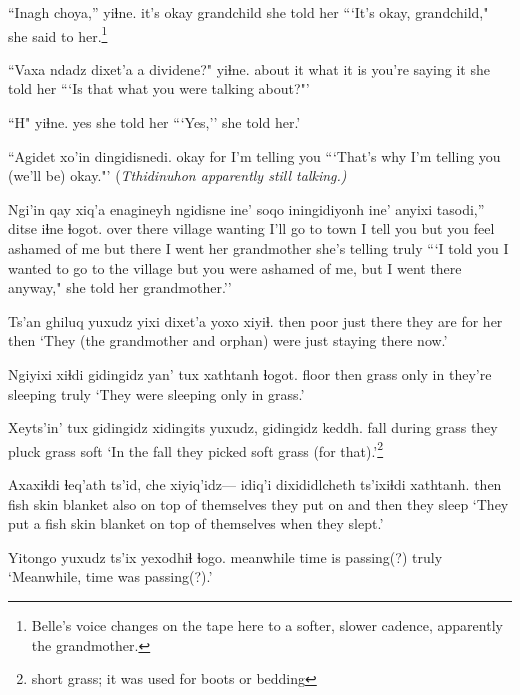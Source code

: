 \documentclass[12pt]{article}
\begin{document}
\gll ``Inagh     choya,''      yiɬne.
{it's okay}  grandchild {she told her}
\glt ```It's okay, grandchild," she said to her.\footnote{Belle's voice changes on the tape here to a softer, slower cadence, apparently the grandmother.}
\glend

\gll ``Vaxa ndadz dixet'a a dividene?"       yiɬne.
{about it} what  {it is} {}  {you're saying it} {she told her}
\glt ```Is that what you were talking about?"'
\glend

\gll ``H" yiɬne.
yes   {she told her}
\glt ```Yes,'' she told her.'
\glend

\gll ``Agidet xo'in dingidisnedi.
{okay}  for   {I'm telling you}
\glt ```That's why I'm telling you (we'll be) okay."' (\em Tthidinuhon \em apparently still talking.)
\glend

\gll Ngi'in     qay     xiq'a enagineyh ngidisne   ine' {soqo iningidiyonh} ine' anyixi     tasodi,'' ditse           iɬne          ɬogot.
{over there} village wanting {I'll go to town}  {I tell you} but  {you feel ashamed of me} but {there} {I went}  {her grandmother} {she's telling } truly
\glt ```I told you I wanted to go to the village but you were ashamed of me, but I went there anyway," she told her grandmother.''
\glend

\gll Ts'an ghiluq yuxudz yixi       dixet'a  yoxo    xiyiɬ.
then poor just there {they are}  {for her} then
\glt `They (the grandmother and orphan) were just staying there now.'
\glend

\gll Ngiyixi xiɬdi gidingidz yan' tux xathtanh       ɬogot.
floor    then  grass     only in {they're sleeping} truly
\glt `They were sleeping only in grass.'
\glend

\gll Xeyts'in' tux    gidingidz xidingits  yuxudz, gidingidz keddh.
fall      during grass     {they pluck} {}    grass     soft 
\glt `In the fall they picked soft grass (for that).'\footnote{short grass; it was used for boots or bedding}
\glend

\gll Axaxiɬdi ɬeq'ath   ts'id,  che  xiyiq'idz--- idiq'i dixididlcheth       ts'ixiɬdi xathtanh.
then {fish skin} blanket also {} {on top of themselves} {they put on} {and then} {they sleep}
\glt `They put a fish skin blanket on top of themselves when they slept.'
\glend

\gll Yitongo   yuxudz {ts'ix yexodhiɬ}       ɬogo.
meanwhile  {}    {time is passing(?)} truly
\glt `Meanwhile, time was passing(?).'
\glend
\end{document}
